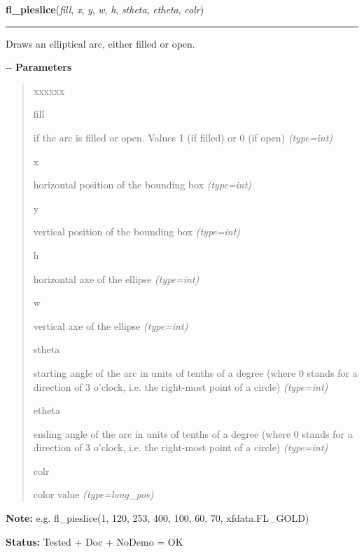 \hspace{.8\funcindent}\begin{boxedminipage}{\funcwidth}

    \raggedright \textbf{fl\_pieslice}(\textit{fill}, \textit{x}, \textit{y}, \textit{w}, \textit{h}, \textit{stheta}, \textit{etheta}, \textit{colr})

    \vspace{-1.5ex}

    \rule{\textwidth}{0.5\fboxrule}
\setlength{\parskip}{2ex}

Draws an elliptical arc, either filled or open.

-{}-
\setlength{\parskip}{1ex}
      \textbf{Parameters}
      \vspace{-1ex}

      \begin{quote}
        \begin{Ventry}{xxxxxx}

          \item[fill]


if the arc is filled or open. Values 1 (if filled) or 0 (if open)
            {\it (type=int)}

          \item[x]


horizontal position of the bounding box
            {\it (type=int)}

          \item[y]


vertical position of the bounding box
            {\it (type=int)}

          \item[h]


horizontal axe of the ellipse
            {\it (type=int)}

          \item[w]


vertical axe of the ellipse
            {\it (type=int)}

          \item[stheta]


starting angle of the arc in units of tenths of a degree (where 0
stands for a direction of 3 o'clock, i.e. the right-most point of a
circle)
            {\it (type=int)}

          \item[etheta]


ending angle of the arc in units of tenths of a degree (where 0
stands for a direction of 3 o'clock, i.e. the right-most point of a
circle)
            {\it (type=int)}

          \item[colr]


color value
            {\it (type=long\_pos)}

        \end{Ventry}

      \end{quote}

\textbf{Note:} 
e.g. fl\_pieslice(1, 120, 253, 400, 100, 60, 70, xfdata.FL\_GOLD)


\textbf{Status:} 
Tested + Doc + NoDemo = OK


    \end{boxedminipage}

